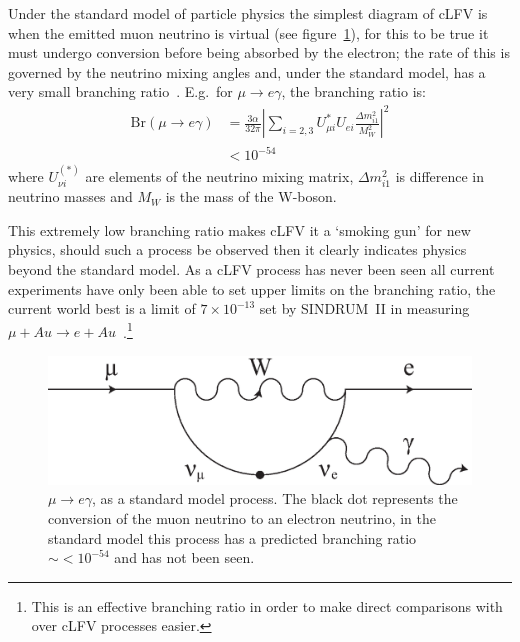 Under the standard model of particle physics the simplest diagram of cLFV is when the emitted muon neutrino is virtual (see figure~\ref{fig:images_cLFV_mu-e_conversion}), for this to be true it must undergo conversion before being absorbed by the electron; the rate of this is governed by the neutrino mixing angles and, under the standard model, has a very small branching ratio~\cite{effective_lagrangian_for_clfv}. E.g.\ for \( \mu\rightarrow e\gamma \), the branching ratio is: 
\begin{align}
  \text{Br}(\mu\rightarrow e\gamma) 
    &= \frac{3\alpha}{32\pi}
      \left|\sum\limits_{i=2,3} U^*_{\mu i} U_{ei}
            \frac{\Delta m^2_{i1}}{M^2_W}
     \right|^2 \\
    &< 10^{-54} \label{equ:clfv_branching_ratio}
\end{align}
where \( U_{\nu i}^{(*)} \) are elements of the neutrino mixing matrix, \(\Delta m^2_{i1}\) is difference in neutrino masses and \(M_{W}\) is the mass of the W-boson.

This extremely low branching ratio makes cLFV it a `smoking gun' for new physics, should such a process be observed then it clearly indicates physics beyond the standard model. As a cLFV process has never been seen all current experiments have only been able to set upper limits on the branching ratio, the current world best is a limit of \(7\times10^{-13}\) set by SINDRUM~II in measuring \(\mu+Au\rightarrow e+Au\)~\cite{sindrum_2_mu_ag_e}.\footnote{This is an effective branching ratio in order to make direct comparisons with over cLFV processes easier.}

\begin{figure}[hptb]
  \centering
    \includegraphics[width=.7\textwidth]{images/cLFV_mu-e_conversion.eps}
  \caption{\(\mu\rightarrow e\gamma\), as a standard model process. The black dot represents the conversion of the muon neutrino to an electron neutrino, in the standard model this process has a predicted branching ratio \(\sim <10^{-54} \) and has not been seen.}
  \label{fig:images_cLFV_mu-e_conversion}
\end{figure}


